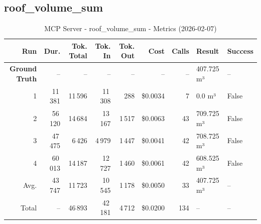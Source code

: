 \documentclass[a4paper,11pt]{article}
\begin{document}
\clearpage
\subsection{roof\_volume\_sum}

\begin{table}[ht]
\centering
\scriptsize
\caption{MCP Server - roof\_volume\_sum - Metrics (2026-02-07)}
\label{tab:mcp\_roof\_volume\_sum\_metrics\_2026-02-07}
\begin{tabular}{r r r r r r r p{3cm} l}
\hline
Run & Dur. & Tok. Total & Tok. In & Tok. Out & Cost & Calls & Result & Success \\
\hline
\textbf{Ground Truth} & -- & -- & -- & -- & -- & -- & 407.725 m³ & -- \\
1 & 11\,381 & 11\,596 & 11\,308 & 288 & \$0.0034 & 7 & 0.0 m³ & False \\
2 & 56\,120 & 14\,684 & 13\,167 & 1\,517 & \$0.0063 & 43 & 709.725 m³ & False \\
3 & 47\,475 & 6\,426 & 4\,979 & 1\,447 & \$0.0041 & 42 & 708.725 m³ & False \\
4 & 60\,013 & 14\,187 & 12\,727 & 1\,460 & \$0.0061 & 42 & 608.525 m³ & False \\
\hline
Avg. & 43\,747 & 11\,723 & 10\,545 & 1\,178 & \$0.0050 & 33 & 407.725 m³ & -- \\
Total & -- & 46\,893 & 42\,181 & 4\,712 & \$0.0200 & 134 & -- & -- \\
\hline
\end{tabular}
\end{table}

\clearpage
\end{document}
